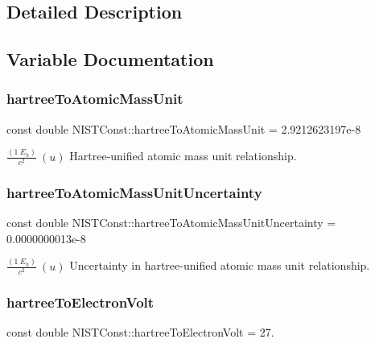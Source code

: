 \subsection{Detailed Description}


\subsection{Variable Documentation}
\mbox{\label{group___hartree_gafc823cd4d405fbad0af7abf03a28917d}} 
\subsubsection{\texorpdfstring{hartree\+To\+Atomic\+Mass\+Unit}{hartreeToAtomicMassUnit}}
{\footnotesize\ttfamily const double N\+I\+S\+T\+Const\+::hartree\+To\+Atomic\+Mass\+Unit = 2.\+9212623197e-\/8}

$\frac{(1\ E_h)}{c^2} \ (u)$ Hartree-\/unified atomic mass unit relationship. \mbox{\label{group___hartree_ga7be8625774a1b159233ac984e904cdb2}} 
\subsubsection{\texorpdfstring{hartree\+To\+Atomic\+Mass\+Unit\+Uncertainty}{hartreeToAtomicMassUnitUncertainty}}
{\footnotesize\ttfamily const double N\+I\+S\+T\+Const\+::hartree\+To\+Atomic\+Mass\+Unit\+Uncertainty = 0.\+0000000013e-\/8}

$\frac{(1\ E_h)}{c^2} \ (u)$ Uncertainty in hartree-\/unified atomic mass unit relationship. \mbox{\label{group___hartree_ga225406ee0c3f44db3c49563e7dd253ce}} 
\subsubsection{\texorpdfstring{hartree\+To\+Electron\+Volt}{hartreeToElectronVolt}}
{\footnotesize\ttfamily const double N\+I\+S\+T\+Const\+::hartree\+To\+Electron\+Volt = 27.}

